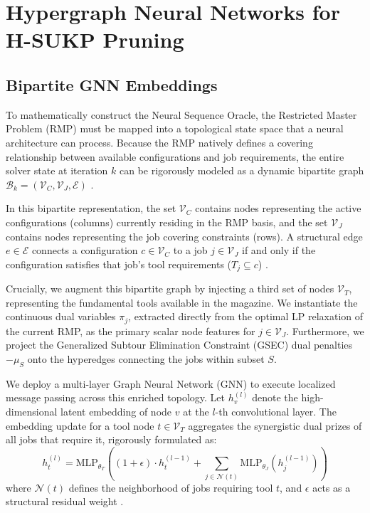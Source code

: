 \documentclass[11pt, a4paper]{book}
\begin{document}
	
	\section{Hypergraph Neural Networks for H-SUKP Pruning}
	
	\subsection{Bipartite GNN Embeddings}
	
	To mathematically construct the Neural Sequence Oracle, the Restricted Master Problem (RMP) must be mapped into a topological state space that a neural architecture can process. Because the RMP natively defines a covering relationship between available configurations and job requirements, the entire solver state at iteration $k$ can be rigorously modeled as a dynamic bipartite graph $\mathcal{B}_k = (\mathcal{V}_C, \mathcal{V}_J, \mathcal{E})$ %
	.
	
	In this bipartite representation, the set $\mathcal{V}_C$ contains nodes representing the active configurations (columns) currently residing in the RMP basis, and the set $\mathcal{V}_J$ contains nodes representing the job covering constraints (rows). A structural edge $e \in \mathcal{E}$ connects a configuration $c \in \mathcal{V}_C$ to a job $j \in \mathcal{V}_J$ if and only if the configuration satisfies that job's tool requirements ($T_j \subseteq c$) %
	. 
	
	Crucially, we augment this bipartite graph by injecting a third set of nodes $\mathcal{V}_T$, representing the fundamental tools available in the magazine. We instantiate the continuous dual variables $\pi_j$, extracted directly from the optimal LP relaxation of the current RMP, as the primary scalar node features for $j \in \mathcal{V}_J$. Furthermore, we project the Generalized Subtour Elimination Constraint (GSEC) dual penalties $-\mu_S$ onto the hyperedges connecting the jobs within subset $S$.
	
	We deploy a multi-layer Graph Neural Network (GNN) to execute localized message passing across this enriched topology. Let $h_v^{(l)}$ denote the high-dimensional latent embedding of node $v$ at the $l$-th convolutional layer. The embedding update for a tool node $t \in \mathcal{V}_T$ aggregates the synergistic dual prizes of all jobs that require it, rigorously formulated as:
	\begin{equation}
		h_t^{(l)} = \text{MLP}_{\theta_T} \left( (1 + \epsilon) \cdot h_t^{(l-1)} + \sum_{j \in \mathcal{N}(t)} \text{MLP}_{\theta_J}\left( h_j^{(l-1)} \right) \right)
	\end{equation}
	where $\mathcal{N}(t)$ defines the neighborhood of jobs requiring tool $t$, and $\epsilon$ acts as a structural residual weight %
	. 
	
\end{document}

